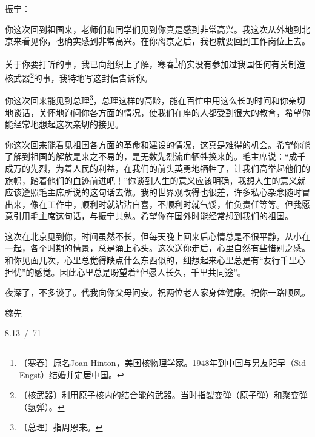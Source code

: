 \documentclass[12pt,UTF-8,openany]{ctexbook}
\begin{document}
\begin{normalsize}
    
    \noindent 振宁：
    
    \vspace{24pt}
    
    你这次回到祖国来，老师们和同学们见到你真是感到非常高兴。我这次从外地到北京来看见你，也确实感到非常高兴。在你离京之后，我也就要回到工作岗位上去。
    
    关于你要打听的事，我已向组织上了解，寒春\footnote{〔寒春〕原名Joan Hinton，美国核物理学家。1948年到中国与男友阳早（Sid Engst）结婚并定居中国。}确实没有参加过我国任何有关制造核武器\footnote{〔核武器〕利用原子核内的结合能的武器。当时指裂变弹（原子弹）和聚变弹（氢弹）。}的事，我特地写这封信告诉你。
    
    你这次回来能见到总理\footnote{〔总理〕指周恩来。}，总理这样的高龄，能在百忙中用这么长的时间和你亲切地谈话，关怀地询问你各方面的情况，使我们在座的人都受到很大的教育，希望你能经常地想起这次亲切的接见。
    
    你这次回来能看见祖国各方面的革命和建设的情况，这真是难得的机会。希望你能了解到祖国的解放是来之不易的，是无数先烈流血牺牲换来的。毛主席说：“成千成万的先烈，为着人民的利益，在我们的前头英勇地牺牲了，让我们高举起他们的旗帜，踏着他们的血迹前进吧！”你谈到人生的意义应该明确，我想人生的意义就应该遵照毛主席所说的这句话去做。我的世界观改得也很差，许多私心杂念随时冒出来，像在工作中，顺利时就沾沾自喜，不顺利时就气馁，怕负责任等等。但我愿意引用毛主席这句话，与振宁共勉。希望你在国外时能经常想到我们的祖国。
    
    这次在北京见到你，时间虽然不长，但每天晚上回来后心情总是不很平静，从小在一起，各个时期的情景，总是涌上心头。这次送你走后，心里自然有些惜别之感。和你见面几次，心里总觉得缺点什么东西似的，细想起来心里总是有“友行千里心担忧”的感觉。因此心里总是盼望着“但愿人长久，千里共同途”。
    
    夜深了，不多谈了。代我向你父母问安。祝两位老人家身体健康。祝你一路顺风。
    
    \hfill 稼先
    
    \hfill 8.13~/~71
    
    \vspace{36pt}
    
    \begin{flushright}
        
    \end{flushright}
    
    
    
\end{normalsize}
\end{document}
